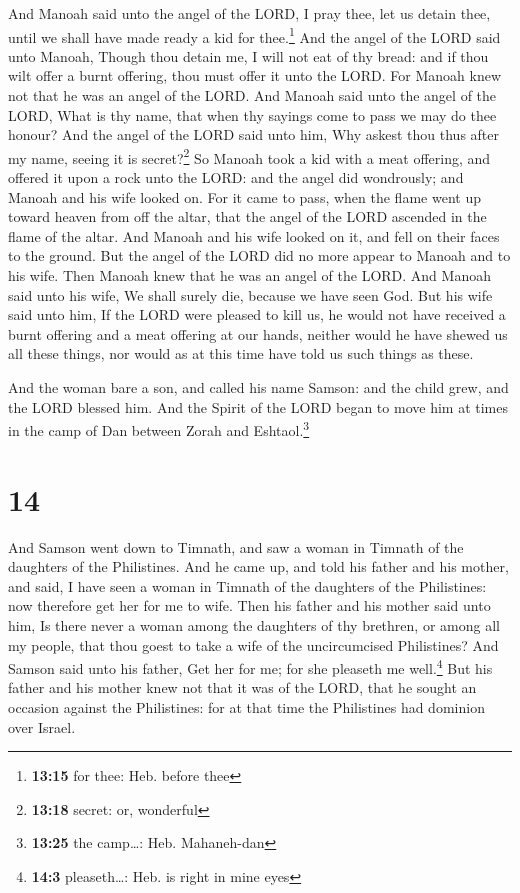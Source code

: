  And Manoah said unto the angel of the LORD, I pray thee,
let us detain thee, until we shall have made ready a kid for
thee.\footnote{\textbf{13:15} for thee: Heb. before thee}
 And the angel of the LORD said unto Manoah, Though thou
detain me, I will not eat of thy bread: and if thou wilt offer a burnt
offering, thou must offer it unto the LORD. For Manoah knew not that he
was an angel of the LORD.  And Manoah said unto the angel
of the LORD, What is thy name, that when thy sayings come to pass we may
do thee honour?  And the angel of the LORD said unto him,
Why askest thou thus after my name, seeing it is secret?\footnote{\textbf{13:18}
  secret: or, wonderful}  So Manoah took a kid with a
meat offering, and offered it upon a rock unto the LORD: and the angel
did wondrously; and Manoah and his wife looked on.  For
it came to pass, when the flame went up toward heaven from off the
altar, that the angel of the LORD ascended in the flame of the altar.
And Manoah and his wife looked on it, and fell on their faces to the
ground.  But the angel of the LORD did no more appear to
Manoah and to his wife. Then Manoah knew that he was an angel of the
LORD.  And Manoah said unto his wife, We shall surely
die, because we have seen God.  But his wife said unto
him, If the LORD were pleased to kill us, he would not have received a
burnt offering and a meat offering at our hands, neither would he have
shewed us all these things, nor would as at this time have told us such
things as these.

 And the woman bare a son, and called his name Samson:
and the child grew, and the LORD blessed him.  And the
Spirit of the LORD began to move him at times in the camp of Dan between
Zorah and Eshtaol.\footnote{\textbf{13:25} the camp\ldots: Heb.
  Mahaneh-dan}

\hypertarget{section-13}{%
\section{14}\label{section-13}}

 And Samson went down to Timnath, and saw a woman in
Timnath of the daughters of the Philistines.  And he came
up, and told his father and his mother, and said, I have seen a woman in
Timnath of the daughters of the Philistines: now therefore get her for
me to wife.  Then his father and his mother said unto him,
Is there never a woman among the daughters of thy brethren, or among all
my people, that thou goest to take a wife of the uncircumcised
Philistines? And Samson said unto his father, Get her for me; for she
pleaseth me well.\footnote{\textbf{14:3} pleaseth\ldots: Heb. is right
  in mine eyes}  But his father and his mother knew not
that it was of the LORD, that he sought an occasion against the
Philistines: for at that time the Philistines had dominion over Israel.

